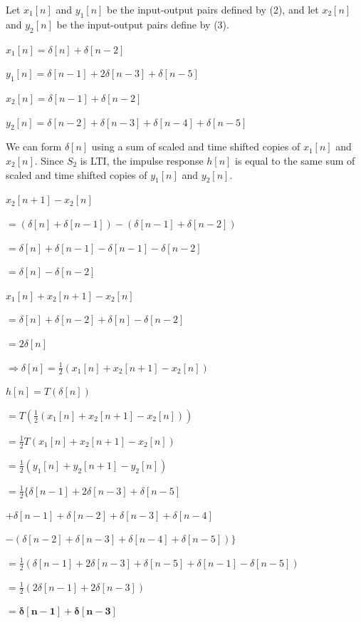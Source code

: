 \documentclass[fleqn]{article}
\begin{document}
\begin{enumerate}[nolistsep]
\begin{enumerate}
				Let $x_1[n]$ and $y_1[n]$ be the input-output pairs defined by (2), and let $x_2[n]$ and $y_2[n]$ be the input-output pairs define by (3).
				
			$x_1[n] = \delta[n] + \delta[n-2]$
			
			$y_1[n] = \delta[n-1] + 2\delta[n-3] + \delta[n-5]$
			
			$x_2[n] = \delta[n-1] + \delta[n-2]$
			
			$y_2[n] = \delta[n-2] + \delta[n-3] + \delta[n-4] + \delta[n-5]$
			
			We can form $\delta[n]$ using a sum of scaled and time shifted copies of $x_1[n]$ and $x_2[n]$. Since $S_2$ is LTI, the impulse response $h[n]$ is equal to the same sum of scaled and time shifted copies of $y_1[n]$ and $y_2[n]$.
			
			$x_2[n+1] - x_2[n]$
			
			$ = (\delta[n] + \delta[n-1]) - (\delta[n-1] + \delta[n-2])$
			
			$ = \delta[n] + \delta[n-1] - \delta[n-1] - \delta[n-2]$
			
			$ = \delta[n] - \delta[n-2]$
			
			$x_1[n] + x_2[n+1] - x_2[n]$
			
			$ = \delta[n] + \delta[n-2] + \delta[n] - \delta[n-2]$
			
			$ = 2\delta[n]$
			
			$\Rightarrow \delta[n] = \frac{1}{2}(x_1[n] + x_2[n+1] - x_2[n])$
			
			$h[n] = T(\delta[n])$
			
			$ = T(\frac{1}{2}(x_1[n] + x_2[n+1] - x_2[n]))$
			
			$ = \frac{1}{2}T(x_1[n] + x_2[n+1] - x_2[n])$
			
			$ = \frac{1}{2}(y_1[n] + y_2[n+1] - y_2[n])$
			
			$ = \frac{1}{2}\{\delta[n-1] + 2\delta[n-3] + \delta[n-5]$
			
			$ + \delta[n-1] + \delta[n-2] + \delta[n-3] + \delta[n-4]$
			
			$ - (\delta[n-2] + \delta[n-3] + \delta[n-4] + \delta[n-5])\}$
			
			$ = \frac{1}{2}(\delta[n-1] + 2\delta[n-3] + \delta[n-5] + \delta[n-1] - \delta[n-5])$
			
			$ = \frac{1}{2}(2\delta[n-1] + 2\delta[n-3])$
			
			$\mathbf{ = \delta[n-1] + \delta[n-3]}$
			\end{enumerate}
		
	\end{enumerate}
\end{document}
